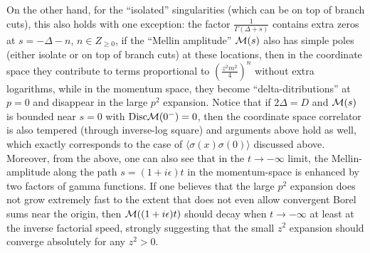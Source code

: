 \documentclass[a4paper,11pt]{article}
\begin{document}
On the other hand, for the ``isolated'' singularities (which can be on top of branch cuts), this also holds with one exception:  the factor $\frac{1}{\Gamma(\Delta+s)}$ contains extra zeros 
at $s=-\Delta-n$, $n\in Z_{\ge 0}$, if the ``Mellin amplitude'' ${\cal M}(s)$ also has simple poles (either isolate or on top of branch cuts) at these locations, then in the coordinate space they contribute to terms proportional to $\left(\frac{z^2m^2}{4}\right)^n$ without extra logarithms, while in the momentum space, they become ``delta-ditributions'' at $p=0$ and disappear in the large $p^2$ expansion. Notice that if $2\Delta=D$ and ${\cal M}(s)$ is bounded near $s=0$ with ${\rm Disc}{\cal M}(0^-)=0$, then the coordinate space correlator is also tempered (through inverse-log square) and arguments above hold as well, which exactly corresponds to the case of $\langle \sigma(x)\sigma(0)\rangle$ discussed above. Moreover, from the above, one can also see that in the $t \rightarrow -\infty$ limit, the Mellin-amplitude along the path $s=(1+i\epsilon)t$ in the momentum-space is enhanced by two factors of gamma functions. If one believes that the large $p^2$ expansion does not grow extremely fast to the extent that does not even allow convergent Borel sums near the origin, then ${\cal M}((1+i\epsilon)t)$ should decay when $t \rightarrow -\infty$ at least at the inverse factorial speed, strongly suggesting that the small $z^2$ expansion should converge absolutely for any $z^2>0$. 
\end{document}
